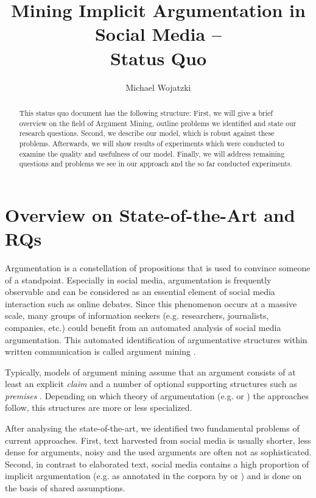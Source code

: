 \documentclass[11pt]{article}
\title{Mining Implicit Argumentation in Social Media --  \\ Status Quo}
\author{Michael Wojatzki}
\date{}
\begin{document}
\maketitle
\begin{abstract}
This status quo document has the following structure:
First, we will give a brief overview on the field of Argument Mining, outline problems we identified and state our research questions.
Second, we describe our model, which is robust against these problems.
Afterwards, we will show results of experiments which were conducted to examine the quality and usefulness of our model.
Finally, we will address remaining questions and problems we see in our approach and the so far conducted experiments. 
\end{abstract}



\section{Overview on State-of-the-Art and RQs}

Argumentation is a constellation of propositions that is used to convince someone of a standpoint.
Especially in social media, argumentation is frequently observable and can be considered as an essential element of social media interaction such as online debates.
Since this phenomenon occurs at a massive scale, many groups of information seekers (e.g. researchers, journalists, companies, etc.) could benefit from an automated analysis of social media argumentation.
This automated identification of argumentative structures within written communication is called argument mining \cite{green2014argmining}.

Typically, models of argument mining assume that an argument consists of at least an explicit \textit{claim} and a number of optional supporting structures such as \textit{premises} \cite{palau2009argumentation,peldszus2013ranking}.
Depending on which theory of argumentation (e.g.  or ) the approaches follow, this structures are more or less specialized.


After analysing the state-of-the-art, we identified two fundamental problems of current approaches.
First, text harvested from social media is usually shorter, less dense for arguments, noisy and the used arguments are often not as sophisticated.
Second, in contrast to elaborated text, social media contains a high proportion of implicit argumentation (e.g. as annotated in the corpora by  or ) and is done on the basis of shared assumptions.
\end{document}
